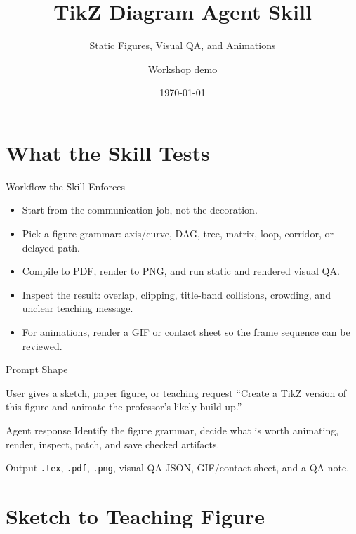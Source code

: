 \documentclass{beamer}
\title{TikZ Diagram Agent Skill}
\subtitle{Static Figures, Visual QA, and Animations}
\author{Workshop demo}
\institute{Agent-assisted research and teaching figures}
\date{\today}
\begin{document}
\begin{frame}
  \titlepage
\end{frame}

\section{What the Skill Tests}

\begin{frame}{Workflow the Skill Enforces}
  \begin{itemize}[<+->]
    \item Start from the communication job, not the decoration.
    \item Pick a figure grammar: axis/curve, DAG, tree, matrix, loop, corridor, or delayed path.
    \item Compile to PDF, render to PNG, and run static and rendered visual QA.
    \item Inspect the result: overlap, clipping, title-band collisions, crowding, and unclear teaching message.
    \item For animations, render a GIF or contact sheet so the frame sequence can be reviewed.
  \end{itemize}
\end{frame}

\begin{frame}{Prompt Shape}
  \small
  \begin{block}{User gives a sketch, paper figure, or teaching request}
    ``Create a TikZ version of this figure and animate the professor's likely build-up.''
  \end{block}
  \begin{block}{Agent response}
    Identify the figure grammar, decide what is worth animating, render, inspect, patch, and save checked artifacts.
  \end{block}
  \begin{block}{Output}
    \texttt{.tex}, \texttt{.pdf}, \texttt{.png}, visual-QA JSON, GIF/contact sheet, and a QA note.
  \end{block}
\end{frame}

\section{Sketch to Teaching Figure}
\end{document}
